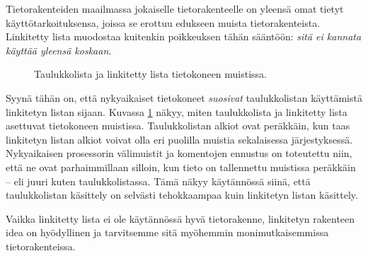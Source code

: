 Tietorakenteiden maailmassa jokaiselle tietorakenteelle
on yleensä omat tietyt käyttötarkoituksensa,
joissa se erottuu edukseen muista tietorakenteista.
Linkitetty lista muodostaa kuitenkin poikkeuksen tähän sääntöön:
\emph{sitä ei kannata käyttää yleensä koskaan}.

\begin{figure}
\center
{}
\caption{Taulukkolista ja linkitetty lista tietokoneen muistissa.}
\label{fig:taulin}
\end{figure}

Syynä tähän on, että nykyaikaiset tietokoneet
\emph{suosivat} taulukkolistan käyttämistä linkitetyn listan sijaan.
Kuvassa \ref{fig:taulin} näkyy, miten taulukkolista ja linkitetty lista
asettuvat tietokoneen muistissa.
Taulukkolistan alkiot ovat peräkkäin, kun taas linkitetyn
listan alkiot voivat olla eri puolilla muistia sekalaisessa
järjestyksessä.
Nykyaikaisen prosessorin välimuistit ja komentojen ennustus
on toteutettu niin, että ne ovat parhaimmillaan silloin,
kun tieto on tallennettu muistissa peräkkäin -- eli juuri kuten
taulukkolistassa.
Tämä näkyy käytännössä siinä, että taulukkolistan käsittely on selvästi
tehokkaampaa kuin linkitetyn listan käsittely.

Vaikka linkitetty lista ei ole käytännössä hyvä tietorakenne,
linkitetyn rakenteen idea on hyödyllinen
ja tarvitsemme sitä myöhemmin monimutkaisemmissa tietorakenteissa.
